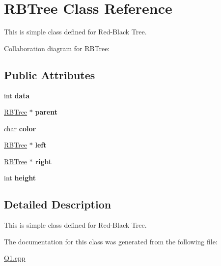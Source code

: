 \hypertarget{classRBTree}{}\section{R\+B\+Tree Class Reference}
\label{classRBTree}


This is simple class defined for Red-\/\+Black Tree.  




Collaboration diagram for R\+B\+Tree\+:
\subsection*{Public Attributes}
\begin{DoxyCompactItemize}
\item 
\mbox{\label{classRBTree_a1bb27cdd03c95852889ed8f6ad782f40}} 
int {\bfseries data}
\item 
\mbox{\label{classRBTree_a9200bfd28bd65d33574a55e8b419791b}} 
\hyperlink{classRBTree}{R\+B\+Tree} $\ast$ {\bfseries parent}
\item 
\mbox{\label{classRBTree_a82b1dd0a15a99bea40a5cd502c7b75e8}} 
char {\bfseries color}
\item 
\mbox{\label{classRBTree_af24187879c2b9f2aed8c38dfda4721ec}} 
\hyperlink{classRBTree}{R\+B\+Tree} $\ast$ {\bfseries left}
\item 
\mbox{\label{classRBTree_a29db62e37cd4aff655128b625eb6f639}} 
\hyperlink{classRBTree}{R\+B\+Tree} $\ast$ {\bfseries right}
\item 
\mbox{\label{classRBTree_afbb6c94b451848eedcf9e7dfaef089e2}} 
int {\bfseries height}
\end{DoxyCompactItemize}


\subsection{Detailed Description}
This is simple class defined for Red-\/\+Black Tree. 

The documentation for this class was generated from the following file\+:\begin{DoxyCompactItemize}
\item 
\hyperlink{Q1_8cpp}{Q1.\+cpp}\end{DoxyCompactItemize}

